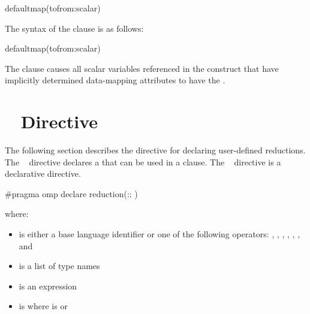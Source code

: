 \begin{boxedcode}
defaultmap(tofrom:scalar)
\end{boxedcode}
\ccppspecificend

\fortranspecificstart
The syntax of the  clause is as follows:

\begin{boxedcode}
defaultmap(tofrom:scalar)
\end{boxedcode}
\fortranspecificend

\descr
The  clause causes all scalar variables
referenced in the construct that have implicitly determined data-mapping
attributes to have the  .








\section{~ Directive}
\label{sec:declare reduction Directive}
\summary
The following section describes the directive for declaring user-defined reductions. The 
~ directive declares a  that can be used in a 
 clause. The ~ directive is a declarative directive.

\syntax
\ccppspecificstart
\begin{boxedcode}
\#pragma omp declare reduction(:: 
)
\end{boxedcode}

where:

\begin{itemize}

\item {} is either a base language identifier or one of the following 
operators: 
\code{+}, 
\code{-}, 
\code{*}, 
\code{\&}, 
\code{|}, 
\code{\^}, 
\code{\&\&} and 
\code{||} 

\item {} is a list of type names 

\item {} is an expression 

\item {} is \code{)}
where  is\linebreak
{} or \code{(}\code{)} 
\end{itemize}
\ccppspecificend


